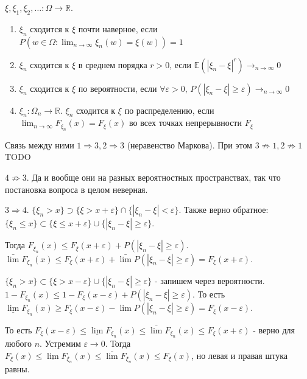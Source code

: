 \begin{definition}
    $\xi, \xi_1, \xi_2, \ldots : \Omega \to \mathbb{R}$.

    \begin{enumerate}
        \item $\xi_n$ сходится к $\xi$ почти наверное, если $P(w \in \Omega : \lim_{n \to \infty} \xi_n(w) = \xi (w)) = 1$
        \item $\xi_n$ сходится к $\xi$ в среднем порядка $r > 0$, если $\mathbb{E} (|\xi_n - \xi|^r) \rightarrow_{n \to \infty} 0$
        \item $\xi_n$ сходится к $\xi$ по вероятности, если $\forall \varepsilon > 0,  \, P(|\xi_n - \xi| \geqslant \varepsilon) \rightarrow_{n \to \infty} 0$
        \item $\xi_n : \Omega_n \to \mathbb{R}$. $\xi_n$ сходится к $\xi$ по распределению, если
        $\lim_{n \to \infty} F_{\xi_n} (x) = F_{\xi} (x)$ во всех точках непрерывности $F_{\xi}$
    \end{enumerate}

    Связь между ними $1 \Rightarrow 3, 2 \Rightarrow 3$ (неравенство Маркова). При этом $3 \not \Rightarrow 1, 2 \not \Rightarrow 1$
    \color{red}
      TODO
    \color{black}

    $4 \not \Rightarrow 3$. Да и вообще они на разных вероятностных пространствах,
    так что постановка вопроса в целом неверная.

    $3 \Rightarrow 4$. $\{ \xi_n > x \} \supset \{ \xi > x+ \varepsilon \} \cap \{ |\xi_n - \xi| < \varepsilon \}$. Также верно обратное:
    $\{ \xi_n \leqslant x \} \subset \{ \xi \leqslant x+ \varepsilon \} \cup \{ |\xi_n - \xi| \geqslant \varepsilon \}$.

    Тогда $F_{\xi_n}(x) \leqslant F_{\xi}(x + \varepsilon) + P(|\xi_n - \xi| \geqslant \varepsilon)$.
    $\bar{\lim} F_{\xi_n}(x) \leqslant F_{\xi}(x + \varepsilon) + \bar{\lim} P(|\xi_n - \xi| \geqslant \varepsilon) = F_{\xi}(x + \varepsilon)$.

    $\{ \xi_n > x \} \subset \{ \xi > x - \varepsilon \} \cup \{ |\xi_n - \xi| \geqslant \varepsilon \}$ - запишем через вероятности.
    $1 - F_{\xi_n}(x) \leqslant 1 - F_{\xi}(x - \varepsilon) + P(|\xi_n - \xi| \geqslant \varepsilon)$. То есть
    $\underline{\lim} F_{\xi_n}(x) \geqslant F_{\xi}(x - \varepsilon) - \lim P(|\xi_n - \xi| \geqslant \varepsilon) = F_{\xi}(x - \varepsilon)$.

    То есть $F_{\xi}(x - \varepsilon) \leqslant \underline{\lim} F_{\xi_n}(x) \leqslant \overline{\lim} F_{\xi_n}(x) \leqslant F_{\xi}(x + \varepsilon)$ - верно для любого $n$.
    Устремим $\varepsilon \rightarrow 0$. Тогда $F_{\xi}(x) \leqslant \underline{\lim} F_{\xi_n}(x) \leqslant \overline{\lim} F_{\xi_n}(x) \leqslant F_{\xi}(x)$, но левая и правая штука равны.

\end{definition}

